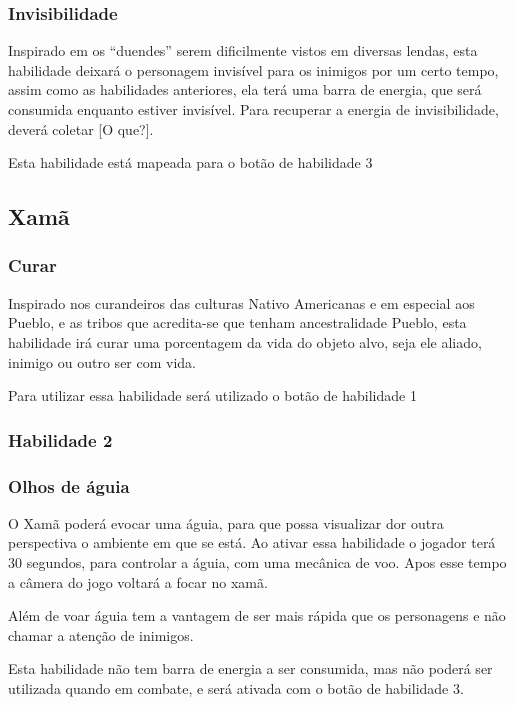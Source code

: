 \subsubsection{Invisibilidade}
Inspirado em os ``duendes'' serem dificilmente vistos em diversas lendas, esta habilidade deixará o personagem invisível para os inimigos por um certo tempo, assim como as habilidades anteriores, ela terá uma barra de energia, que será consumida enquanto estiver invisível. Para recuperar a energia de invisibilidade, deverá coletar [O que?].

Esta habilidade está mapeada para o botão de habilidade 3 



\subsection{Xamã}
\subsubsection{Curar}
Inspirado nos curandeiros das culturas Nativo Americanas e em especial aos Pueblo, e as tribos que acredita-se que tenham ancestralidade Pueblo, esta habilidade irá curar uma porcentagem da vida do objeto alvo, seja ele aliado, inimigo ou outro ser com vida.

Para utilizar essa habilidade será utilizado o botão de habilidade 1

\subsubsection{Habilidade 2}

\subsubsection{Olhos de águia}

O Xamã poderá evocar uma águia, para que possa visualizar dor outra perspectiva o ambiente em que se está. Ao ativar essa habilidade o jogador terá 30 segundos, para controlar a águia, com uma mecânica de voo. Apos esse tempo a câmera do jogo voltará a focar no xamã.

Além de voar águia tem a vantagem de ser mais rápida que os personagens e não chamar a atenção de inimigos.

Esta habilidade não tem barra de energia a ser consumida, mas não poderá ser utilizada quando em combate, e será ativada com o botão de habilidade 3. 


